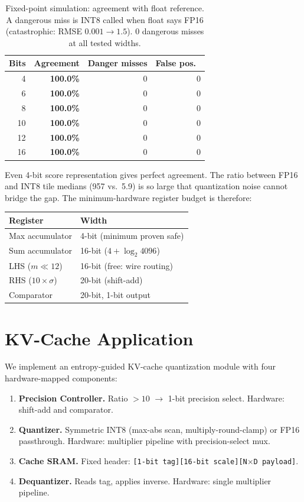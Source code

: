 \documentclass[10pt,twocolumn]{article}
\begin{document}
\begin{table}[tbp]
\centering
\caption{Fixed-point simulation: agreement with float reference.
  A dangerous miss is INT8 called when float says FP16
  (catastrophic: RMSE $0.001 \to 1.5$). 0 dangerous misses
  at all tested widths.}
\label{tab:fixedpoint}
\small
\begin{tabular}{rrrr}
\toprule
Bits & Agreement & Danger misses & False pos.\ \\
\midrule
 4 & \textbf{100.0\%} & 0 & 0 \\
 6 & \textbf{100.0\%} & 0 & 0 \\
 8 & \textbf{100.0\%} & 0 & 0 \\
10 & \textbf{100.0\%} & 0 & 0 \\
12 & \textbf{100.0\%} & 0 & 0 \\
16 & \textbf{100.0\%} & 0 & 0 \\
\bottomrule
\end{tabular}
\end{table}

Even 4-bit score representation gives perfect agreement. The ratio
between FP16 and INT8 tile medians (957 vs.\ 5.9) is so large that
quantization noise cannot bridge the gap. The minimum-hardware
register budget is therefore:

\begin{center}
\small
\begin{tabular}{ll}
\toprule
Register & Width \\
\midrule
Max accumulator & 4-bit (minimum proven safe) \\
Sum accumulator & 16-bit ($4 + \log_2 4096$) \\
LHS ($m \ll 12$) & 16-bit (free: wire routing) \\
RHS ($10\times\sigma$) & 20-bit (shift-add) \\
Comparator & 20-bit, 1-bit output \\
\bottomrule
\end{tabular}
\end{center}

\section{KV-Cache Application}

We implement an entropy-guided KV-cache quantization module with four
hardware-mapped components:

\begin{enumerate}
  \item \textbf{Precision Controller.} Ratio $> 10$ $\rightarrow$
    1-bit precision select. Hardware: shift-add and comparator.
  \item \textbf{Quantizer.} Symmetric INT8 (max-abs scan,
    multiply-round-clamp) or FP16 passthrough. Hardware: multiplier
    pipeline with precision-select mux.
  \item \textbf{Cache SRAM.} Fixed header:
    \texttt{[1-bit tag][16-bit scale][N$\times$D payload]}.
  \item \textbf{Dequantizer.} Reads tag, applies inverse. Hardware:
    single multiplier pipeline.
\end{enumerate}
\end{document}
